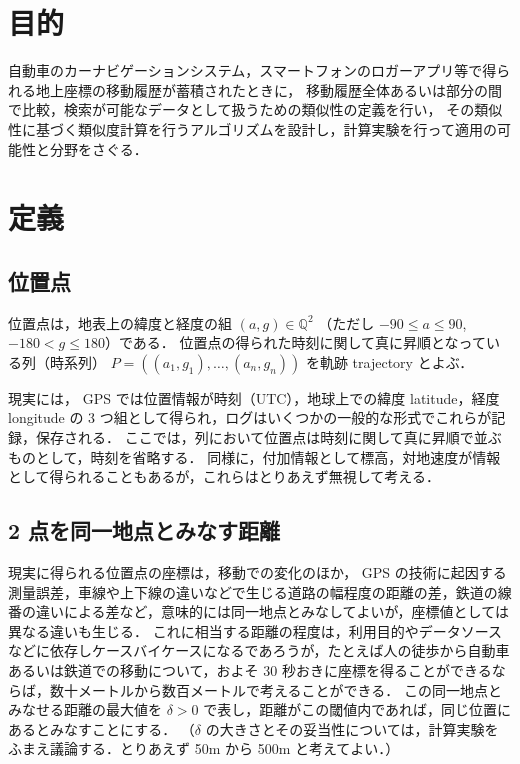 \documentclass[11pt]{jarticle}
\begin{document}
\section{目的}

自動車のカーナビゲーションシステム，スマートフォンのロガーアプリ等で得られる地上座標の移動履歴が蓄積されたときに，
移動履歴全体あるいは部分の間で比較，検索が可能なデータとして扱うための類似性の定義を行い，
その類似性に基づく類似度計算を行うアルゴリズムを設計し，計算実験を行って適用の可能性と分野をさぐる．

\section{定義}

\subsection{位置点}
位置点は，地表上の緯度と経度の組 $(a, g) \in \mathbb{Q}^2$ （ただし $-90 \leq a \leq 90$, $-180 < g \leq 180$）である．
位置点の得られた時刻に関して真に昇順となっている列（時系列） $P = ((a_1, g_1), \ldots,(a_n,g_n))$ を軌跡 trajectory とよぶ．

現実には，
GPS では位置情報が時刻（UTC），地球上での緯度 latitude，経度 longitude の 3 つ組として得られ，ログはいくつかの一般的な形式でこれらが記録，保存される．
ここでは，列において位置点は時刻に関して真に昇順で並ぶものとして，時刻を省略する．
同様に，付加情報として標高，対地速度が情報として得られることもあるが，これらはとりあえず無視して考える．

\subsection{2 点を同一地点とみなす距離}
現実に得られる位置点の座標は，移動での変化のほか，
GPS の技術に起因する測量誤差，車線や上下線の違いなどで生じる道路の幅程度の距離の差，鉄道の線番の違いによる差など，意味的には同一地点とみなしてよいが，座標値としては異なる違いも生じる．
これに相当する距離の程度は，利用目的やデータソースなどに依存しケースバイケースになるであろうが，たとえば人の徒歩から自動車あるいは鉄道での移動について，およそ 30 秒おきに座標を得ることができるならば，数十メートルから数百メートルで考えることができる．
この同一地点とみなせる距離の最大値を $\delta > 0$ で表し，距離がこの閾値内であれば，同じ位置にあるとみなすことにする．
（$\delta$ の大きさとその妥当性については，計算実験をふまえ議論する．とりあえず 50m から 500m と考えてよい．）
\end{document}
